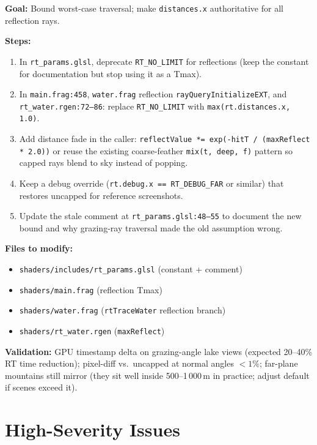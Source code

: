 \documentclass[11pt,a4paper]{article}
\begin{document}
\begin{tcolorbox}[promptbox={Prompt: Cap Reflection Tmax and Fade to Sky}]
\textbf{Goal:} Bound worst-case traversal; make \texttt{distances.x} authoritative for all reflection rays.

\textbf{Steps:}
\begin{enumerate}
    \item In \texttt{rt\_params.glsl}, deprecate \texttt{RT\_NO\_LIMIT} for reflections (keep the constant for documentation but stop using it as a Tmax).
    \item In \texttt{main.frag:458}, \texttt{water.frag} reflection \texttt{rayQueryInitializeEXT}, and \texttt{rt\_water.rgen:72--86}: replace \texttt{RT\_NO\_LIMIT} with \texttt{max(rt.distances.x, 1.0)}.
    \item Add distance fade in the caller: \texttt{reflectValue *= exp(-hitT / (maxReflect * 2.0))} or reuse the existing coarse-feather \texttt{mix(t, deep, f)} pattern so capped rays blend to sky instead of popping.
    \item Keep a debug override (\texttt{rt.debug.x == RT\_DEBUG\_FAR} or similar) that restores uncapped for reference screenshots.
    \item Update the stale comment at \texttt{rt\_params.glsl:48--55} to document the new bound and why grazing-ray traversal made the old assumption wrong.
\end{enumerate}

\textbf{Files to modify:}
\begin{itemize}
    \item \texttt{shaders/includes/rt\_params.glsl} (constant + comment)
    \item \texttt{shaders/main.frag} (reflection Tmax)
    \item \texttt{shaders/water.frag} (\texttt{rtTraceWater} reflection branch)
    \item \texttt{shaders/rt\_water.rgen} (\texttt{maxReflect})
\end{itemize}

\textbf{Validation:} GPU timestamp delta on grazing-angle lake views (expected 20--40\% RT time reduction); pixel-diff vs.\ uncapped at normal angles $< 1\%$; far-plane mountains still mirror (they sit well inside 500--1\,000\,m in practice; adjust default if scenes exceed it).
\end{tcolorbox}

\section{High-Severity Issues}
\end{document}
